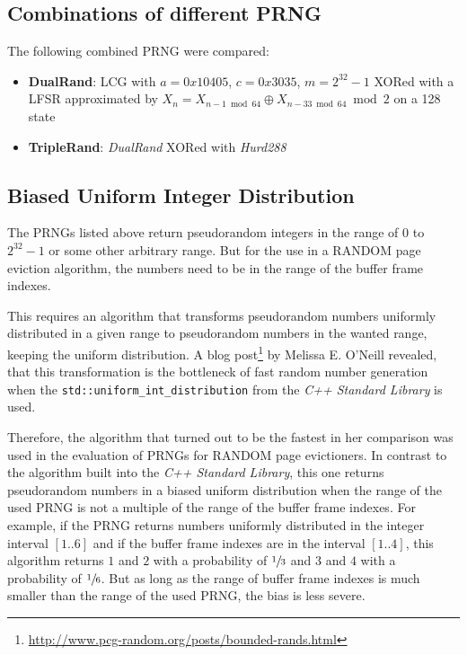 \subsection[Combinations of different PRNG]{Combinations of different PRNG} \label{subsec:combination}

    The following combined PRNG were compared:
    \begin{itemize}
        \itemsep0em
        \item \textbf{DualRand}: LCG with $a = 0x10405$, $c = 0x3035$, $m = 2^{32} - 1$ XORed with a LFSR approximated by $X_n = X_{n - 1 \bmod 64} \oplus X_{n - 33 \bmod 64} \bmod 2$ on a \SI{128}{\bit} state
        \item \textbf{TripleRand}: \textit{DualRand} XORed with \textit{Hurd288}
    \end{itemize}

\subsection[Biased Uniform Int Distribution]{Biased Uniform Integer Distribution} \label{subsec:distribution}

    The PRNGs listed above return pseudorandom integers in the range of $0$ to $2^{32} - 1$ or some other arbitrary range. But for the use in a RANDOM page eviction algorithm, the numbers need to be in the range of the buffer frame indexes.

    This requires an algorithm that transforms pseudorandom numbers uniformly distributed in a given range to pseudorandom numbers in the wanted range, keeping the uniform distribution. A blog post\footnote[11]{\url{http://www.pcg-random.org/posts/bounded-rands.html}} by Melissa E. O'Neill revealed, that this transformation is the bottleneck of fast random number generation when the \lstinline|std::uniform_int_distribution| from the \textit{C++ Standard Library} is used.

    Therefore, the algorithm that turned out to be the fastest in her comparison was used in the evaluation of PRNGs for RANDOM page evictioners. In contrast to the algorithm built into the \textit{C++ Standard Library}, this one returns pseudorandom numbers in a biased uniform distribution when the range of the used PRNG is not a multiple of the range of the buffer frame indexes. For example, if the PRNG returns numbers uniformly distributed in the integer interval $\left[1 .. 6\right]$ and if the buffer frame indexes are in the interval $\left[1 .. 4\right]$, this algorithm returns $1$ and $2$ with a probability of $\sfrac{1}{3}$ and $3$ and $4$ with a probability of $\sfrac{1}{6}$. But as long as the range of buffer frame indexes is much smaller than the range of the used PRNG, the bias is less severe.

